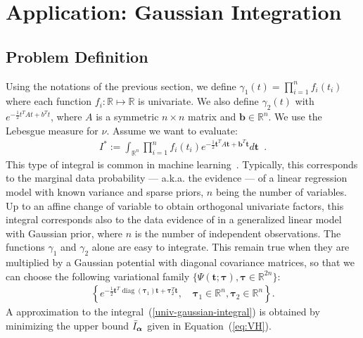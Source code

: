 \documentclass[reqno,oneside,letterpaper,10pt]{article}
\renewcommand{\t}{\mathbf{t}}
\newcommand{\I}{I}
\newcommand{\diag}[1]{\mathop{\textrm{diag}}\left(#1\right)}
\newcommand{\transp}{^{T}}
\def\A{A}
\def\btau{{\bm{\tau}}}
\renewcommand{\Re}{\mathbb{R}}
\begin{document}


\section{Application: Gaussian Integration}

\subsection{Problem Definition}

Using the notations of the previous section, we define $\gamma_1(t)=\prod_{i=1}^n f_i(t_i)$ where each function $f_i:\Re\mapsto \Re$ is univariate. We also define $\gamma_2(t)$ with $e^{-\frac 12 t\transp \A t + b\transp t}$, where $A$ is a symmetric $n\times n$ matrix and $\bm b\in\Re^n$.
We use the Lebesgue measure for $\nu$. Assume we want to evaluate: 
\begin{eqnarray} 
I^*:=\int_{\Re^n}  \prod_{i=1}^n f_i(t_i)
e^{-\frac 12 \t\transp \A \t + \bm b\transp \t} d\t
\enspace.
\label{univ-gaussian-integral} 
\end{eqnarray}
This type of integral is common in machine learning~\citep{seeger2010gaussian}. Typically, this corresponds to the marginal data probability --- a.k.a. the evidence --- of a linear regression model with known variance and sparse priors, $n$ being the number of variables. 
Up to an affine change of variable to obtain orthogonal univariate factors, this integral corresponds also to the data evidence 
of in a generalized linear model with Gaussian prior, where $n$ is the number of independent observations. 
The functions $\gamma_1$ and $\gamma_2$ alone are easy to integrate. This remain true when they are multiplied by a
Gaussian potential with diagonal covariance matrices, so that we can choose the following variational family
$\{\Psi(\t;\btau) ,\btau\in\Re^{2n}\}$:
\begin{eqnarray}
	\left\lbrace
		e^{-\frac 12 \t\transp\diag{\btau_1}\t +  \btau_2\transp\t},
		\quad \btau_1\in\Re^n,\btau_2 \in \Re^n 
	\right\rbrace
.
\label{Gaussian-pivot-functions}
\end{eqnarray}
A approximation to the integral~(\ref{univ-gaussian-integral})  is obtained by minimizing the upper bound $\bar\I_\balpha$ given in Equation~(\ref{eq:VH}).


\end{document}
